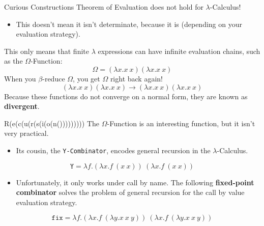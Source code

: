 \documentclass[11pt]{beamer}
\begin{document}
\begin{frame}[fragile=singleslide]{Curious Constructions}
Theorem of Evaluation does not hold for $\lambda$-Calculus!
\begin{itemize}
\item This doesn't mean it isn't determinate, because it is (depending on your evaluation strategy).
\end{itemize}
This only means that finite $\lambda$ expressions can have infinite evaluation chains, such as the $\Omega$-Function:
\begin{equation}
\Omega = (\lambda x. x\:x) (\lambda x. x\:x)
\end{equation}
When you $\beta$-reduce $\Omega$, you get $\Omega$ right back again!
\begin{equation}
(\lambda x. x\:x) (\lambda x. x\:x) \rightarrow (\lambda x. x\:x) (\lambda x. x\:x)
\end{equation}
Because these functions do not converge on a normal form, they are known as \textbf{divergent}.
\end{frame}

\begin{frame}[fragile=singleslide]{R(e(c(u(r(s(i(o(n()))))))))}
The $\Omega$-Function is an interesting function, but it isn't very practical. 
\begin{itemize}
\item Its cousin, the \texttt{Y-Combinator}, encodes general recursion in the $\lambda$-Calculus.
\end{itemize}
\begin{equation}
\texttt{Y} = \lambda f. (\lambda x. f\:(x\:x))\:(\lambda x. f\:(x\:x))
\end{equation}
\begin{itemize}
\item Unfortunately, it only works under call by name.  The following \textbf{fixed-point combinator} solves the problem of general recursion for the call by value evaluation strategy.
\end{itemize}
\begin{equation}
\texttt{fix} = \lambda f. (\lambda x. f\:(\lambda y. x\:x\:y))\:(\lambda x. f\:(\lambda y. x\:x\:y))
\end{equation}
\end{frame}
\end{document}
